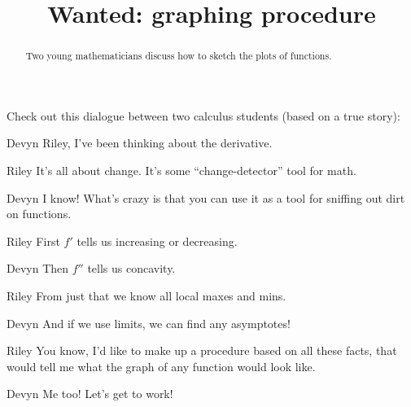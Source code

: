 \documentclass{ximera}
\title[Break-Ground:]{Wanted: graphing procedure}
\begin{document}
\begin{abstract}
Two young mathematicians discuss how to sketch the plots of functions.
\end{abstract}
\maketitle

Check out this dialogue between two calculus students (based on a true
story):

\begin{dialogue}
\item[Devyn] Riley, I've been thinking about the derivative. 
\item[Riley] It's all about change. It's some ``change-detector'' tool
  for math.
\item[Devyn] I know!  What's crazy is that you can use it as a tool
  for sniffing out dirt on functions.
\item[Riley] First $f'$ tells us increasing or decreasing.
\item[Devyn] Then $f''$ tells us concavity.
\item[Riley] From just that we know all local maxes and mins.
\item[Devyn] And if we use limits, we can find any asymptotes!
\item[Riley] You know, I'd like to make up a procedure based on all
  these facts, that would tell me what the graph of any function would look like.
\item[Devyn] Me too! Let's get to work!
\end{dialogue}
\end{document}
